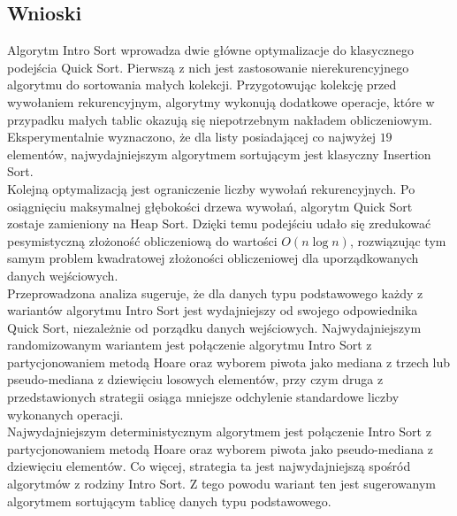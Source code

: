\begin{figure}[]
	\centering
	
	\caption[]{}
	\label{fig:intro-sort-nondeterministic-pivot-random}
\end{figure}

\begin{figure}[]
	\centering
	
	\caption[]{}
	\label{fig:intro-sort-nondeterministic-pivot-reversed}
\end{figure}

\begin{figure}[]
	\centering
	
	\caption[]{}
	\label{fig:intro-sort-nondeterministic-pivot-density}
\end{figure}

\subsection{Wnioski}
Algorytm Intro Sort wprowadza dwie główne optymalizacje do klasycznego podejścia Quick Sort. Pierwszą z nich jest zastosowanie nierekurencyjnego algorytmu do sortowania małych kolekcji. Przygotowując kolekcję przed wywołaniem rekurencyjnym, algorytmy wykonują dodatkowe operacje, które w przypadku małych tablic okazują się niepotrzebnym nakładem obliczeniowym. Eksperymentalnie wyznaczono, że dla listy posiadającej co najwyżej $19$ elementów, najwydajniejszym algorytmem sortującym jest klasyczny Insertion Sort.\\

Kolejną optymalizacją jest ograniczenie liczby wywołań rekurencyjnych. Po osiągnięciu maksymalnej głębokości drzewa wywołań, algorytm Quick Sort zostaje zamieniony na Heap Sort. Dzięki temu podejściu udało się zredukować pesymistyczną złożoność obliczeniową do wartości $O(n\log{n})$, rozwiązując tym samym problem kwadratowej złożoności obliczeniowej dla uporządkowanych danych wejściowych.\\

Przeprowadzona analiza sugeruje, że dla danych typu podstawowego każdy z wariantów algorytmu Intro Sort jest wydajniejszy od swojego odpowiednika Quick Sort, niezależnie od porządku danych wejściowych. Najwydajniejszym randomizowanym wariantem jest połączenie algorytmu Intro Sort z partycjonowaniem metodą Hoare oraz wyborem piwota jako mediana z trzech lub pseudo-mediana z dziewięciu losowych elementów, przy czym druga z przedstawionych strategii osiąga mniejsze odchylenie standardowe liczby wykonanych operacji.\\

Najwydajniejszym deterministycznym algorytmem jest połączenie Intro Sort z partycjonowaniem metodą Hoare oraz wyborem piwota jako pseudo-mediana z dziewięciu elementów. Co więcej, strategia ta jest najwydajniejszą spośród algorytmów z rodziny Intro Sort. Z tego powodu wariant ten jest sugerowanym algorytmem sortującym tablicę danych typu podstawowego.\\
